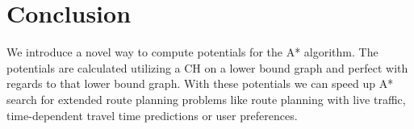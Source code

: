 \documentclass[a4paper,UKenglish,cleveref, autoref]{lipics-v2019}
\begin{document}



\section{Conclusion}
\label{sec:conclusion}

We introduce a novel way to compute potentials for the A* algorithm.
The potentials are calculated utilizing a CH on a lower bound graph and perfect with regards to that lower bound graph.
With these potentials we can speed up A* search for extended route planning problems like route planning with live traffic, time-dependent travel time predictions or user preferences.





\end{document}
